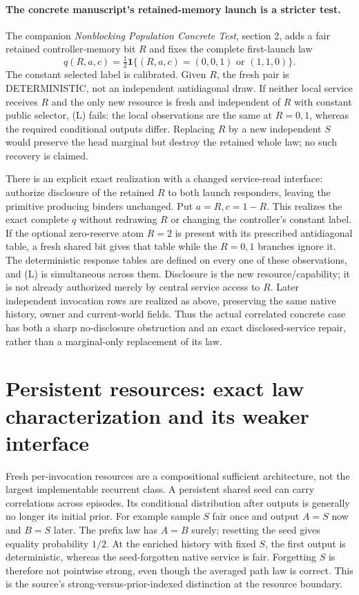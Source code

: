 \documentclass[11pt]{article}
\begin{document}
\paragraph{The concrete manuscript's retained-memory launch is a stricter test.}
The companion \emph{Nonblocking Population Concrete Test}, section 2, adds a fair retained controller-memory bit $R$ and fixes the complete first-launch law
\[
 q(R,a,c)=\tfrac12\mathbf1\{(R,a,c)=(0,0,1)\text{ or }(1,1,0)\}.
\]
The constant selected label is calibrated. Given $R$, the fresh pair is DETERMINISTIC, not an independent antidiagonal draw. If neither local service receives $R$ and the only new resource is fresh and independent of $R$ with constant public selector, (L) fails: the local observations are the same at $R=0,1$, whereas the required conditional outputs differ. Replacing $R$ by a new independent $S$ would preserve the head marginal but destroy the retained whole law; no such recovery is claimed.

There is an explicit exact realization with a changed service-read interface: authorize disclosure of the retained $R$ to both launch responders, leaving the primitive producing binders unchanged. Put $a=R,c=1-R$. This realizes the exact complete $q$ without redrawing $R$ or changing the controller's constant label. If the optional zero-reserve atom $R=2$ is present with its prescribed antidiagonal table, a fresh shared bit gives that table while the $R=0,1$ branches ignore it. The deterministic response tables are defined on every one of these observations, and (L) is simultaneous across them. Disclosure is the new resource/capability; it is not already authorized merely by central service access to $R$. Later independent invocation rows are realized as above, preserving the same native history, owner and current-world fields. Thus the actual correlated concrete case has both a sharp no-disclosure obstruction and an exact disclosed-service repair, rather than a marginal-only replacement of its law.

\section{Persistent resources: exact law characterization and its weaker interface}
Fresh per-invocation resources are a compositional sufficient architecture, not the largest implementable recurrent class. A persistent shared seed can carry correlations across episodes. Its conditional distribution after outputs is generally no longer its initial prior. For example sample $S$ fair once and output $A=S$ now and $B=S$ later. The prefix law has $A=B$ surely; resetting the seed gives equality probability $1/2$. At the enriched history with fixed $S$, the first output is deterministic, whereas the seed-forgotten native service is fair. Forgetting $S$ is therefore not pointwise strong, even though the averaged path law is correct. This is the source's strong-versus-prior-indexed distinction at the resource boundary.
\end{document}
